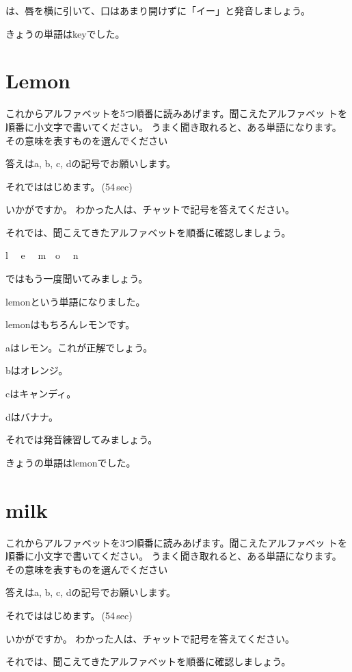 \documentclass[12pt]{jlreq}
\let\textipa\undefined
\begin{document}
\textipa{/i:/}は、唇を横に引いて、口はあまり開けずに「イー」と発音しましょう。

きょうの単語はkeyでした。
\newpage
\section{Lemon}

これからアルファベットを5つ順番に読みあげます。聞こえたアルファベッ
トを順番に小文字で書いてください。
うまく聞き取れると、ある単語になります。
その意味を表すものを選んでください

答えはa, b, c, dの記号でお願いします。

それでははじめます。\faVolumeUp\,(54\,sec)

いかがですか。
わかった人は、チャットで記号を答えてください。

それでは、聞こえてきたアルファベットを順番に確認しましょう。{\large \ComputerMouse}

l\,\,
{\large \ComputerMouse}\,\,
e\,\,
{\large \ComputerMouse}\,\,
m
{\large \ComputerMouse}\,\,
o\,\,
{\large \ComputerMouse}\,\,
n

ではもう一度聞いてみましょう。

lemonという単語になりました。

lemonはもちろんレモンです。

aはレモン。これが正解でしょう。

bはオレンジ。

cはキャンディ。

dはバナナ。


それでは発音練習してみましょう。

きょうの単語はlemonでした。
\newpage
\section{milk}

これからアルファベットを3つ順番に読みあげます。聞こえたアルファベッ
トを順番に小文字で書いてください。
うまく聞き取れると、ある単語になります。
その意味を表すものを選んでください

答えはa, b, c, dの記号でお願いします。

それでははじめます。\faVolumeUp\,(54\,sec)

いかがですか。
わかった人は、チャットで記号を答えてください。

それでは、聞こえてきたアルファベットを順番に確認しましょう。{\large \ComputerMouse}
\end{document}
